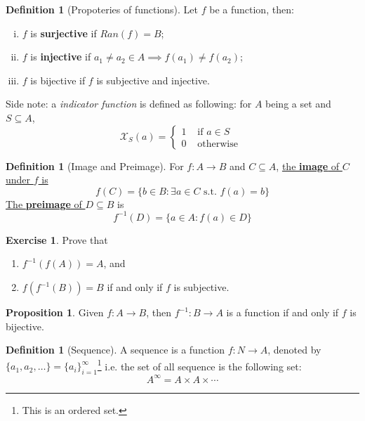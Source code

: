 \documentclass[12pt]{article}
\theoremstyle{definition}
\newtheorem{definition}[theorem]{Definition}
\newtheorem*{exercise_nonum}{Exercise}
\newtheorem{proposition}[theorem]{Proposition}
\theoremstyle{plain}
\begin{document}
\begin{definition}
    [Propoteries of functions] Let $f$ be a function, then: 
    \begin{enumerate}[(i)]
        \item $f$ is \textbf{surjective} if $Ran(f) = B$; 
        \item $f$ is \textbf{injective} if $a_1 \not = a_2 \in A \implies f(a_1) 
            \not = f(a_2)$; 
        \item $f$ is bijective if $f$ is subjective and injective.
    \end{enumerate}
\end{definition}

\noindent Side note: a \textit{indicator function} is defined as following: for 
$A$ being a set and $S\subseteq A$, 
\[
    \mathcal X_S(a) = 
    \begin{cases}
        1 & \text{ if } a \in S \\
        0 & \text{ otherwise }
    \end{cases}
\]

\begin{definition}
    [Image and Preimage]

    For $f: A \to B$ and $C\subseteq A$, \underline{ the \textbf{image} of $C$ under 
    $f$ is }
    \[
        f(C) = 
        \{ 
            b \in B : \exists a \in C \text{ s.t. } f(a) = b
        \}
    \]
    \underline{The \textbf{preimage} of $D\subseteq B$} is 
    \[
        f^{-1}(D) = 
        \{
            a \in A : f(a) \in D
        \}
    \]

\end{definition}

\begin{exercise_nonum}
    Prove that 
    \begin{enumerate}
        \item $f^{-1}(f(A)) = A$, and
        \item $f(f^{-1}(B)) = B$ if and only if $f$ is subjective.
    \end{enumerate}
\end{exercise_nonum}

\begin{proposition}
    Given $f: A \to B$, then $f^{-1}: B \to A$ is a function if and only if $f$ 
    is bijective.
\end{proposition}

\begin{definition}
    [Sequence]

    A sequence is a function $f: N \to A$, denoted by $\{a_1, a_2, \ldots\} = \{ 
    a_i \}_{i=1}^\infty $\footnote{This is an ordered set.}
    i.e. the set of all sequence is the following set: 
    \[
        A^\infty = A \times A \times \cdots
    \]
\end{definition}
\end{document}
